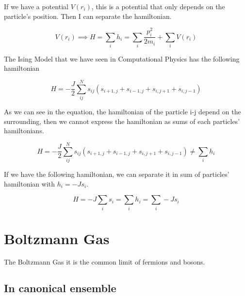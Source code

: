\documentclass[12pt,a4paper]{report}
\newcommand{\esp}{\vspace{0.5cm}}
\begin{document}
	\esp
	
	If we have a potential $V(r_i)$, this is a potential that only depends on the particle's position. Then I can separate the hamiltonian.
	
	\esp
	
	\begin{equation}
		V(r_i) \implies H = \sum_i h_i = \sum_i \frac{p_i^2}{2m_i} + \sum_i V(r_i)
	\end{equation}
	
	\esp
	
	The Ising Model that we have seen in Computational Physics has the following hamiltonian
	
	\esp
	
	\begin{equation}
		H = -\frac{J}{2} \sum_{ij}^N s_{ij} (s_{i+1,j}+s_{i-1,j}+s_{i,j+1}+s_{i,j-1})
	\end{equation}
	
	\esp
	
	As we can see in the equation, the hamiltonian of the particle i-j depend on the surrounding, then we cannot express the hamiltonian as sums of each particles' hamiltonians.
	
	\esp
	
	\begin{equation}
		H = -\frac{J}{2} \sum_{ij}^N s_{ij} (s_{i+1,j}+s_{i-1,j}+s_{i,j+1}+s_{i,j-1}) \neq \sum_i h_i
	\end{equation}
	
	\esp
	
	If we have the following hamiltonian, we can separate it in sum of particles' hamiltonian with $h_i=-Js_i$.
	
	\esp
	
	\begin{equation}
		H = -J \sum_i s_i = \sum_i h_i = \sum_i -Js_i
	\end{equation}
	
	\esp
	
	\section{Boltzmann Gas}
	
	\noindent The Boltzmann Gas it is the common limit of fermions and bosons.
	
	\subsection{In canonical ensemble}
	
\end{document}
